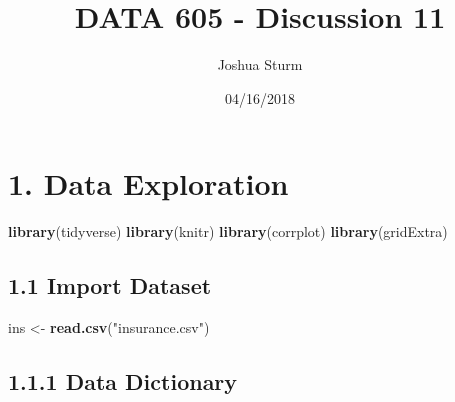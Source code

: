 \documentclass[]{article}
\title{DATA 605 - Discussion 11}
\author{Joshua Sturm}
\date{04/16/2018}
\newenvironment{Shaded}{\begin{snugshade}}{\end{snugshade}}
\newcommand{\KeywordTok}[1]{\textcolor[rgb]{0.13,0.29,0.53}{\textbf{#1}}}
\newcommand{\StringTok}[1]{\textcolor[rgb]{0.31,0.60,0.02}{#1}}
\newcommand{\NormalTok}[1]{#1}
\begin{document}
\maketitle

\section{1. Data Exploration}\label{data-exploration}

\begin{Shaded}
\begin{Highlighting}[]
\KeywordTok{library}\NormalTok{(tidyverse)}
\KeywordTok{library}\NormalTok{(knitr)}
\KeywordTok{library}\NormalTok{(corrplot)}
\KeywordTok{library}\NormalTok{(gridExtra)}
\end{Highlighting}
\end{Shaded}

\subsection{1.1 Import Dataset}\label{import-dataset}

\begin{Shaded}
\begin{Highlighting}[]
\NormalTok{ins <-}\StringTok{ }\KeywordTok{read.csv}\NormalTok{(}\StringTok{"insurance.csv"}\NormalTok{)}
\end{Highlighting}
\end{Shaded}

\subsection{1.1.1 Data Dictionary}\label{data-dictionary}
\end{document}
